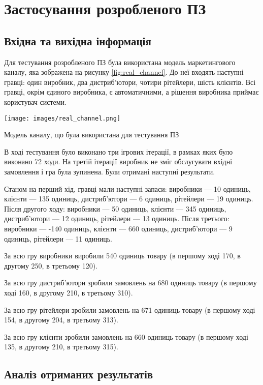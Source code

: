 \section{Застосування розробленого ПЗ}
\subsection{Вхідна та вихідна інформація}

Для тестування розробленого ПЗ була використана модель маркетингового каналу, яка зображена на рисунку \ref{fig:real_channel}. До неї входять наступні гравці: один виробник, два дистриб’ютори, чотири рітейлери, шість клієнтів. Всі гравці, окрім єдиного виробника, є автоматичними, а рішення виробника приймає користувач системи.

\begin{stdfigure}
    \texttt{[image: images/real\_channel.png]}
    \caption{Модель каналу, що була використана для тестування ПЗ}
    \label{fig:real_channel}
\end{stdfigure}

В ході тестування було виконано три ігрових ітерації, в рамках яких було виконано 72 ходи. На третій ітерації виробник не зміг обслугувати вхідні замовлення і гра була зупинена. Були отримані наступні результати.
\begin{longEnumerate}
\item Станом на перший хід, гравці мали наступні запаси: виробники --- 10 одиниць, клієнти --- 135 одиниць, дистриб’ютори --- 6 одиниць, рітейлери --- 19 одиниць. Після другого ходу: виробники --- 50 одиниць, клієнти --- 345 одиниць, дистриб’ютори --- 12 одиниць, рітейлери --- 13 одиниць. Після третього: виробники --- -140 одиниць, клієнти --- 660 одиниць, дистриб’ютори --- 9 одиниць, рітейлери --- 11 одиниць.
\item За всю гру виробники виробили 540 одиниць товару (в першому ході 170, в другому 250, в третьому 120).
\item За всю гру дистриб’ютори зробили замовлень на 680 одиниць товару (в першому ході 160, в другому 210, в третьому 310).
\item За всю гру рітейлери зробили замовлень на 671 одиниць товару (в першому ході 154, в другому 204, в третьому 313).
\item За всю гру клієнти зробили замовлень на 660 одиниць товару (в першому ході 135, в другому 210, в третьому 315).
\end{longEnumerate}

\subsection{Аналіз отриманих результатів}

